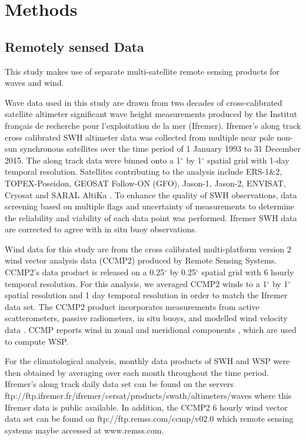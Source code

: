 \documentclass[draft,linenumbers]{agujournal2018}
\begin{document}
\section{Methods}

\subsection{Remotely sensed Data}

This study makes use of separate multi-satellite remote sensing products for waves and wind.   

Wave data used in this study are drawn from two decades of cross-calibrated satellite altimeter significant wave height measurements produced by the Institut fran\c{c}ais de recherche pour l'exploitation de la mer (Ifremer).  Ifremer's along track cross calibrated SWH altimeter data was collected from multiple near pole non-sun synchronous satellites over the time period of 1 January 1993 to 31 December 2015. The along track data were binned onto a 1$^{\circ}$ by 1$^{\circ}$ spatial grid with 1-day temporal resolution. Satellites contributing to the analysis include ERS-1\&2, TOPEX-Poseidon, GEOSAT Follow-ON (GFO), Jason-1, Jason-2, ENVISAT, Cryosat and SARAL AltiKa \cite{Queffeulou2017Global}. To enhance the quality of SWH observations, data screening based on multiple flags and uncertainty of measurements to determine the reliability and viability of each data point was performed. Ifremer SWH data are corrected to agree with in situ buoy observations.

Wind data for this study are from the cross calibrated multi-platform version 2 wind vector analysis data (CCMP2) produced by Remote Sensing Systems. CCMP2's data product is released on a 0.25$^{\circ}$ by 0.25$^{\circ}$ spatial grid with 6 hourly temporal resolution. For this analysis, we averaged CCMP2 winds to a 1$^{\circ}$ by 1$^{\circ}$ spatial resolution and 1 day temporal resolution in order to match the Ifremer data set. The CCMP2 product incorporates measurements from active scatterometers, passive radiometers, in situ buoys, and modelled wind velocity data \cite{Atlas2011Remote}. CCMP reports wind in zonal and meridional components \cite{Atlas2011Remote}, which are used to compute WSP. 

For the climatological analysis, monthly data products of SWH and WSP were then obtained by averaging over each month throughout the time period. Ifremer's along track daily data set can be found on the servers ftp://ftp.ifremer.fr/ifremer/cersat/products/swath/altimeters/waves where this Ifremer data is public available. In addition, the CCMP2 6 hourly wind vector data set can be found on ftp://ftp.remss.com/ccmp/v02.0 which remote sensing systems maybe accessed at  www.remss.com. 
\end{document}

